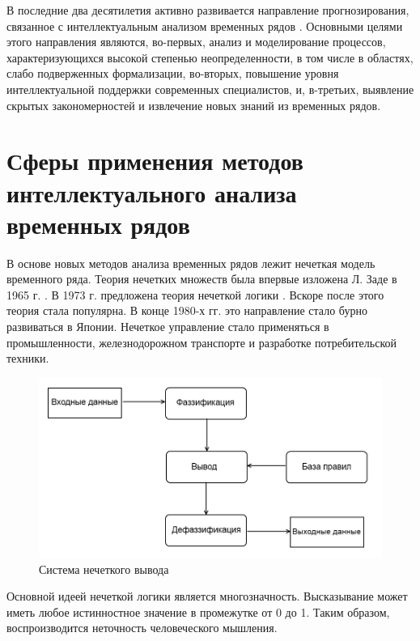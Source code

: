 В последние два десятилетия активно развивается направление прогнозирования, связанное с интеллектуальным анализом временных рядов \cite{Yarushkina2010}. 
Основными целями этого направления являются, во-первых, анализ и моделирование процессов, характеризующихся высокой степенью неопределенности, 
в том числе в областях, слабо подверженных формализации, 
во-вторых, повышение уровня интеллектуальной поддержки современных специалистов, 
и, в-третьих, выявление скрытых закономерностей и извлечение новых знаний из временных рядов. 

\newpage
\section{Сферы применения методов интеллектуального анализа временных рядов}

В основе новых методов анализа временных рядов лежит нечеткая модель временного ряда. 
Теория нечетких множеств была впервые изложена Л. Заде в 1965 г. \cite{zadeh1965fuzzy}. 
В 1973 г. предложена теория нечеткой логики \cite{Zadeh1973}. 
Вскоре после этого теория стала популярна. 
В конце 1980-х гг. это направление стало бурно развиваться в Японии. 
Нечеткое управление стало применяться в промышленности, железнодорожном транспорте и разработке потребительской техники.

\begin{figure}[h]
    \centering
    \includegraphics[width=\textwidth, keepaspectratio]{images/fuzzy_engine.png}
    \caption{Система нечеткого вывода}
    \label{figure:fuzzy_engine}
\end{figure}

Основной идеей нечеткой логики является многозначность. 
Высказывание может иметь любое истинностное значение в промежутке от 0 до 1. 
Таким образом, воспроизводится неточность человеческого мышления.

